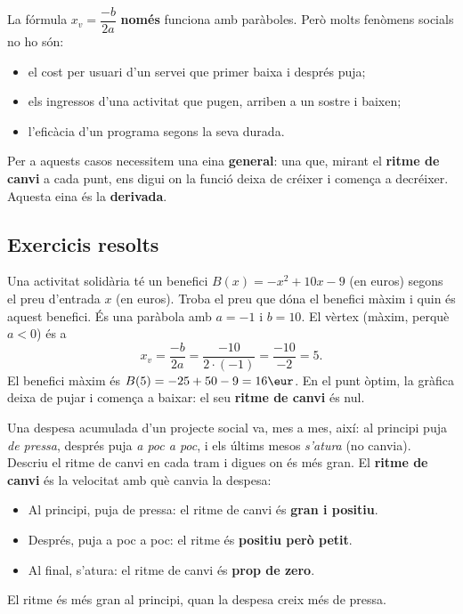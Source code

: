 \begin{exemple}
La fórmula $x_v=\dfrac{-b}{2a}$ \textbf{només} funciona amb paràboles. Però molts
fenòmens socials no ho són:
\begin{itemize}[leftmargin=1.4em, itemsep=2pt]
  \item el cost per usuari d'un servei que primer baixa i després puja;
  \item els ingressos d'una activitat que pugen, arriben a un sostre i baixen;
  \item l'eficàcia d'un programa segons la seva durada.
\end{itemize}
Per a aquests casos necessitem una eina \textbf{general}: una que, mirant el
\textbf{ritme de canvi} a cada punt, ens digui on la funció deixa de créixer i comença
a decréixer. Aquesta eina és la \textbf{derivada}.
\end{exemple}

\subsection{Exercicis resolts}

\begin{exresolt}
Una activitat solidària té un benefici $B(x)=-x^2+10x-9$ (en euros) segons el preu
d'entrada $x$ (en euros). Troba el preu que dóna el benefici màxim i quin és aquest
benefici.
\solucio
És una paràbola amb $a=-1$ i $b=10$. El vèrtex (màxim, perquè $a<0$) és a
\[
x_v=\frac{-b}{2a}=\frac{-10}{2\cdot(-1)}=\frac{-10}{-2}=5.
\]
El benefici màxim és $B(5)=-25+50-9=16\eur$. En el punt òptim, la gràfica deixa de
pujar i comença a baixar: el seu \textbf{ritme de canvi} és nul.
\end{exresolt}

\begin{exresolt}
Una despesa acumulada d'un projecte social va, mes a mes, així: al principi puja
\emph{de pressa}, després puja \emph{a poc a poc}, i els últims mesos \emph{s'atura}
(no canvia). Descriu el ritme de canvi en cada tram i digues on és més gran.
\solucio
El \textbf{ritme de canvi} és la velocitat amb què canvia la despesa:
\begin{itemize}[leftmargin=1.4em, itemsep=2pt]
  \item Al principi, puja de pressa: el ritme de canvi és \textbf{gran i positiu}.
  \item Després, puja a poc a poc: el ritme és \textbf{positiu però petit}.
  \item Al final, s'atura: el ritme de canvi és \textbf{prop de zero}.
\end{itemize}
El ritme és més gran al principi, quan la despesa creix més de pressa.
\end{exresolt}

